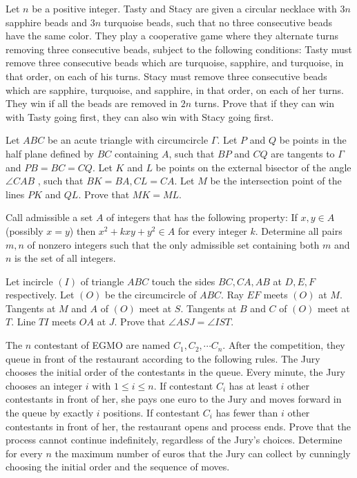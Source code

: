 \documentclass[11pt]{scrartcl}
\begin{document}
\begin{problem}[692237787009642]
	Let $n$ be a positive integer. Tasty and Stacy are given a circular necklace with $3n$ sapphire beads and $3n$ turquoise beads, such that no three consecutive beads have the same color. They play a cooperative game where they alternate turns removing three consecutive beads, subject to the following conditions:
Tasty must remove three consecutive beads which are turquoise, sapphire, and turquoise, in that order, on each of his turns.
Stacy must remove three consecutive beads which are sapphire, turquoise, and sapphire, in that order, on each of her turns.
They win if all the beads are removed in $2n$ turns. Prove that if they can win with Tasty going first, they can also win with Stacy going first.
\end{problem}
\begin{problem}[3104932449951237120]
	Let $ABC$ be an acute triangle with circumcircle $\Gamma$. Let $P$ and $Q$ be points in the half plane defined by $BC$ containing $A$, such that $BP$ and $CQ$ are tangents to $\Gamma$ and $PB = BC = CQ$. Let $K$ and $L$ be points on the external bisector of the angle $\angle CAB$ , such that $BK = BA, CL = CA$. Let $M$ be the intersection point of the lines $PK$ and $QL$. Prove that $MK=ML$.
\end{problem}
\begin{problem}[5407986531182333567]
	Call admissible a set $A$ of integers that has the following property:
If $x,y \in A$ (possibly $x=y$) then $x^2+kxy+y^2 \in A$ for every integer $k$.
Determine all pairs $m,n$ of nonzero integers such that the only admissible set containing both $m$ and $n$ is the set of all integers.
\end{problem}
\begin{problem}[8972547734710795566]
Let incircle $(I)$ of triangle $ABC$ touch the sides $BC,CA,AB$ at $D,E,F$ respectively. Let $(O)$ be the circumcircle of $ABC$. Ray $EF$ meets $(O)$ at $M$. Tangents at $M$ and $A$ of $(O)$ meet at $S$. Tangents at $B$ and $C$ of $(O)$ meet at $T$. Line $TI$ meets $OA$ at $J$. Prove that $\angle ASJ=\angle IST$.
\end{problem}
\begin{problem}[6253841118919498374]
	The $n$ contestant of EGMO are named $C_1, C_2, \cdots C_n$. After the competition, they queue in front of the restaurant according to the following rules.
The Jury chooses the initial order of the contestants in the queue.
Every minute, the Jury chooses an integer $i$ with $1 \leq i \leq n$.
If contestant $C_i$ has at least $i$ other contestants in front of her, she pays one euro to the Jury and moves forward in the queue by exactly $i$ positions.
If contestant $C_i$ has fewer than $i$ other contestants in front of her, the restaurant opens and process ends.
Prove that the process cannot continue indefinitely, regardless of the Jury’s choices.
Determine for every $n$ the maximum number of euros that the Jury can collect by cunningly choosing the initial order and the sequence of moves.
\end{problem}
\end{document}
